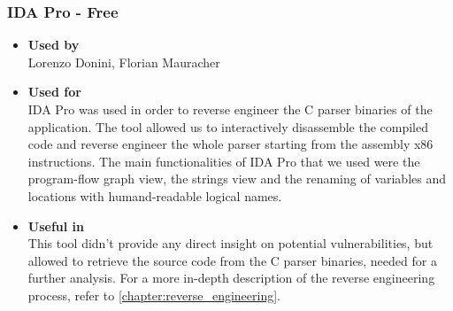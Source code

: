 \subsubsection*{IDA Pro - Free}
\begin{itemize}
	\item \textbf{Used by}\\ Lorenzo Donini, Florian Mauracher
	\item \textbf{Used for}\\ IDA Pro was used in order to reverse engineer the C parser binaries of the \bs{} application. The tool allowed us to interactively disassemble the compiled code and reverse engineer the whole parser starting from the assembly x86 instructions.\newline
	The main functionalities of IDA Pro that we used were the program-flow graph view, the strings view and the renaming of variables and locations with humand-readable logical names.
	\item \textbf{Useful in}\\ This tool didn't provide any direct insight on potential vulnerabilities, but allowed to retrieve the source code from the C parser binaries, needed for a further analysis. For a more in-depth description of the reverse engineering process, refer to \autoref{chapter:reverse_engineering}.
\end{itemize}

